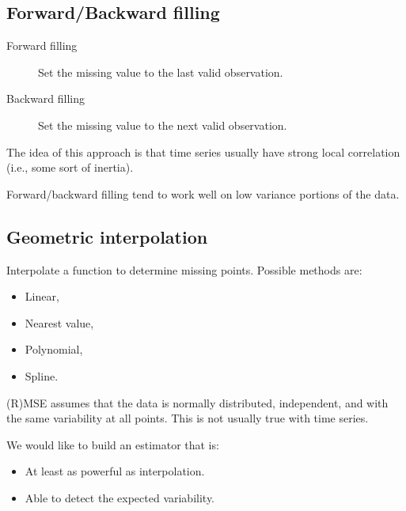 \subsection{Forward/Backward filling}

\begin{description}
    \item[Forward filling] 
        Set the missing value to the last valid observation.

    \item[Backward filling] 
        Set the missing value to the next valid observation.
\end{description}

\begin{remark}
    The idea of this approach is that time series usually have strong local correlation (i.e., some sort of inertia).
\end{remark}

\begin{remark}
    Forward/backward filling tend to work well on low variance portions of the data.
\end{remark}


\subsection{Geometric interpolation}

Interpolate a function to determine missing points. Possible methods are:
\begin{itemize}
    \item Linear,
    \item Nearest value,
    \item Polynomial,
    \item Spline.
\end{itemize}



\begin{remark}
    (R)MSE assumes that the data is normally distributed, independent, and with the same variability at all points. This is not usually true with time series.
\end{remark}

\begin{remark}
    We would like to build an estimator that is:
    \begin{itemize}
        \item At least as powerful as interpolation.
        \item Able to detect the expected variability.
    \end{itemize}
\end{remark}
